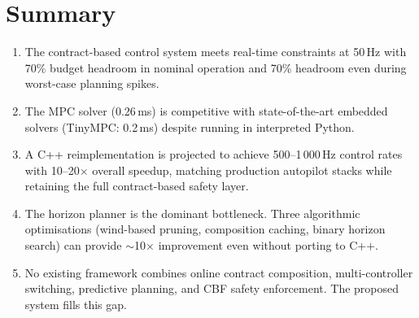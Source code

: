 \section{Summary}

\begin{enumerate}
    \item The contract-based control system meets real-time constraints at 50\,Hz with 70\% budget headroom in nominal operation and 70\% headroom even during worst-case planning spikes.

    \item The MPC solver (0.26\,ms) is competitive with state-of-the-art embedded solvers (TinyMPC: 0.2\,ms) despite running in interpreted Python.

    \item A C++ reimplementation is projected to achieve 500--1\,000\,Hz control rates with 10--20$\times$ overall speedup, matching production autopilot stacks while retaining the full contract-based safety layer.

    \item The horizon planner is the dominant bottleneck. Three algorithmic optimisations (wind-based pruning, composition caching, binary horizon search) can provide $\sim$10$\times$ improvement even without porting to C++.

    \item No existing framework combines online contract composition, multi-controller switching, predictive planning, and CBF safety enforcement. The proposed system fills this gap.
\end{enumerate}
